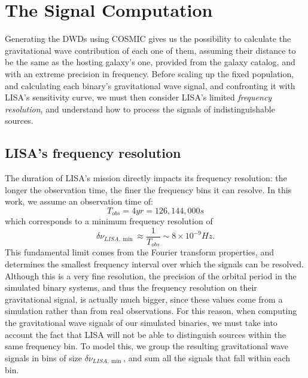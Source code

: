 \section{The Signal Computation}
Generating the DWDs using COSMIC gives us the possibility to calculate the gravitational wave contribution of each one of them, assuming their distance to be the same as the hosting galaxy's one, provided from the galaxy catalog, and with an extreme precision in frequency.
Before scaling up the fixed population, and calculating each binary's gravitational wave signal, and confronting it with LISA's sensitivity curve, we must then consider LISA's limited \textit{frequency resolution}, and understand how to process the signals of indistinguishable sources.

\subsection{LISA's frequency resolution}
The duration of LISA’s mission directly impacts its frequency resolution: the longer the observation time, the finer the frequency bins it can resolve.
In this work, we assume an observation time of: 
\[
    T_{obs}=4yr=126,144,000s
\]
which corresponds to a minimum frequency resolution of
\begin{equation}
    \delta\nu_{LISA,\min}\approx \frac{1}{T_{obs}}\sim 8\times 10^{-9}Hz.
    \label{eq: LISA frequency resolution}
\end{equation}
This fundamental limit comes from the Fourier transform properties, and determines the smallest frequency interval over which the signals can be resolved.
Although this is a very fine resolution, the precision of the orbital period in the simulated binary systems, and thus the frequency resolution on their gravitational signal, is actually much bigger, since these values come from a simulation rather than from real observations.
For this reason, when computing the gravitational wave signals of our simulated binaries, we must take into account the fact that LISA will not be able to distinguish sources within the same frequency bin.
To model this, we group the resulting gravitational wave signals in bins of size $\delta\nu_{LISA,\min}$, and sum all the signals that fall within each bin.

